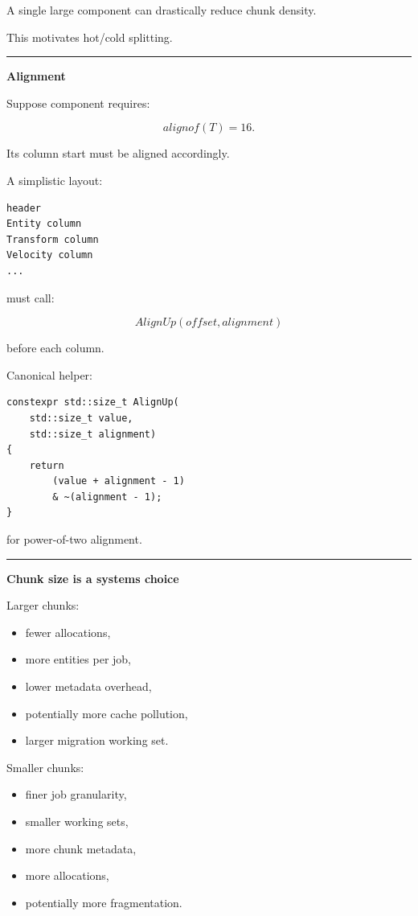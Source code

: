 A single large component can drastically reduce chunk density.

This motivates hot/cold splitting.

\begin{center}\rule{0.5\linewidth}{0.5pt}\end{center}

\textbf{Alignment}

Suppose component requires:

\[
alignof(T)=16.
\]

Its column start must be aligned accordingly.

A simplistic layout:

\begin{verbatim}
header
Entity column
Transform column
Velocity column
...
\end{verbatim}

must call:

\[
AlignUp(offset,alignment)
\]

before each column.

Canonical helper:

\begin{verbatim}
constexpr std::size_t AlignUp(
    std::size_t value,
    std::size_t alignment)
{
    return
        (value + alignment - 1)
        & ~(alignment - 1);
}
\end{verbatim}

for power-of-two alignment.

\begin{center}\rule{0.5\linewidth}{0.5pt}\end{center}

\textbf{Chunk size is a systems choice}

Larger chunks:

\begin{itemize}
\tightlist
\item
  fewer allocations,
\item
  more entities per job,
\item
  lower metadata overhead,
\item
  potentially more cache pollution,
\item
  larger migration working set.
\end{itemize}

Smaller chunks:

\begin{itemize}
\tightlist
\item
  finer job granularity,
\item
  smaller working sets,
\item
  more chunk metadata,
\item
  more allocations,
\item
  potentially more fragmentation.
\end{itemize}

